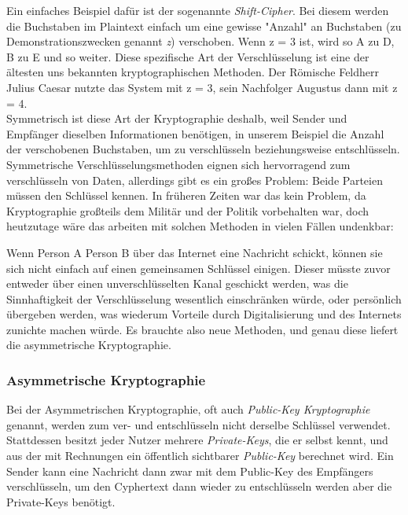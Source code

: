 \documentclass[12pt]{IEEEtran}
\begin{document}
Ein einfaches Beispiel dafür ist der sogenannte \textit{Shift-Cipher}. Bei diesem werden die Buchstaben im Plaintext einfach um eine gewisse "Anzahl" an Buchstaben (zu Demonstrationszwecken genannt \textit{z}) verschoben. Wenn z = 3 ist, wird so A zu D, B zu E und so weiter. Diese spezifische Art der Verschlüsselung ist eine der ältesten uns bekannten kryptographischen Methoden. Der Römische Feldherr Julius Caesar nutzte das System mit z = 3, sein Nachfolger Augustus dann mit z = 4. \cite{Uhl2022Krypto} \\

Symmetrisch ist diese Art der Kryptographie deshalb, weil Sender und Empfänger dieselben Informationen benötigen, in unserem Beispiel die Anzahl der verschobenen Buchstaben, um zu verschlüsseln beziehungsweise entschlüsseln. \\

Symmetrische Verschlüsselungsmethoden eignen sich hervorragend zum verschlüsseln von Daten, allerdings gibt es ein großes Problem: Beide Parteien müssen den Schlüssel kennen. In früheren Zeiten war das kein Problem, da Kryptographie großteils dem Militär und der Politik vorbehalten war, doch heutzutage wäre das arbeiten mit solchen Methoden in vielen Fällen undenkbar:

Wenn Person A Person B über das Internet eine Nachricht schickt, können sie sich nicht einfach auf einen gemeinsamen Schlüssel einigen. Dieser müsste zuvor entweder über einen unverschlüsselten Kanal geschickt werden, was die Sinnhaftigkeit der Verschlüsselung wesentlich einschränken würde, oder persönlich übergeben werden, was wiederum Vorteile durch Digitalisierung und des Internets zunichte machen würde. Es brauchte also neue Methoden, und genau diese liefert die asymmetrische Kryptographie. \cite{mavroeidis2018impact}

\subsubsection{Asymmetrische Kryptographie}

Bei der Asymmetrischen Kryptographie, oft auch \textit{Public-Key Kryptographie} genannt, werden zum ver- und entschlüsseln nicht derselbe Schlüssel verwendet. Stattdessen besitzt jeder Nutzer mehrere \textit{Private-Keys}, die er selbst kennt, und aus der mit Rechnungen ein öffentlich sichtbarer \textit{Public-Key} berechnet wird. Ein Sender kann eine Nachricht dann zwar mit dem Public-Key des Empfängers verschlüsseln, um den Cyphertext dann wieder zu entschlüsseln werden aber die Private-Keys benötigt. \cite{mavroeidis2018impact} \\
\end{document}
